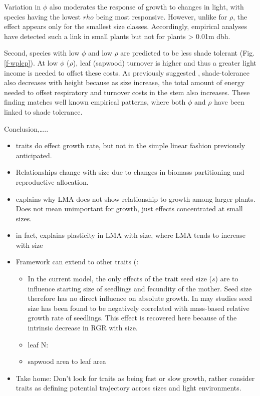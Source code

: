 \documentclass[12pt, a4paper]{article}
\begin{document}
Variation in \(\phi\) also moderates the response of growth to changes
in light, with species having the lowest \(rho\) being most responsive.
However, unlike for \(\rho\), the effect appears only for the smallest
size classes. Accordingly, empirical analyses have detected such a link
in small plants but not for plants \textgreater{} 0.01m
dbh\citep{ruger-2012}.

Second, species with low \(\phi\) and low \(\rho\) are predicted to be
less shade tolerant (Fig. \ref{f-wplcp}). At low \(\phi\) (\(\rho\)),
leaf (sapwood) turnover is higher and thus a greater light income is
needed to offset these costs. As previously suggested
\citep{givnish-1988}, shade-tolerance also decreases with
height because as size increase, the total amount of energy needed to
offset respiratory and turnover costs in the stem also increases. These
finding matches well known empirical patterns, where both \(\phi\) and
\(\rho\) have been linked to shade tolerance\citep{poorter-2006, lusk-2008,osunkoya-1996}.

Conclusion,\ldots{}..

\begin{itemize}
\itemsep1pt\parskip0pt
\item
  traits do effect growth rate, but not in the simple linear fashion
  previously anticipated.
\item
  Relationships change with size due to changes in biomass partitioning
  and reproductive allocation.
\item
  explains why LMA does not show relationship to growth among larger
  plants. Does not mean unimportant for growth, just effects
  concentrated at small sizes.
\item
  in fact, explains plasticity in LMA with size, where LMA tends to
  increase with size \citep{thomas-1999;
  @thomas-2010}
\item
  Framework can extend to other traits (:

  \begin{itemize}
  \itemsep1pt\parskip0pt
  \item
    In the current model, the only effects of the trait seed size
    (\(s\)) are to influence starting size of seedlings and fecundity of
    the mother. Seed size therefore has no direct influence on absolute
    growth. In may studies seed size has been found to be negatively
    correlated with mass-based relative growth rate of seedlings. This
    effect is recovered here because of the intrinsic decrease in RGR
    with size.
  \item
    leaf N:
  \item
    sapwood area to leaf area
  \end{itemize}
\item
  Take home: Don't look for traits as being fast or slow growth, rather
  consider traits as defining potential trajectory across sizes and
  light environments.
\end{itemize}
\end{document}

